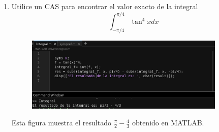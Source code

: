 \documentclass[12pt]{article}
\begin{document}
\begin{enumerate}[label=(\alph*)]
\item Utilice un CAS para encontrar el valor exacto de la integral
  \[
  \int_{-\pi/4}^{\pi/4} \tan^4{x} dx
  \]

\begin{figure}[H]
  \centering
  \includegraphics[width=0.9\textwidth]{../img/img_Lista4/cas2.png}
\end{figure}
Esta figura muestra el resultado $\frac{\pi}{2} - \frac{4}{3}$ obtenido en MATLAB.


\end{enumerate}
\end{document}
